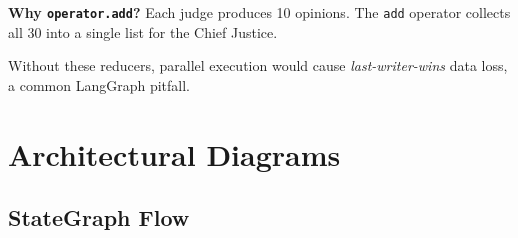\documentclass[11pt,a4paper]{article}
\begin{document}
\textbf{Why \texttt{operator.add}?}  Each judge produces 10 opinions.
The \texttt{add} operator collects all 30 into a single list for the Chief
Justice.

Without these reducers, parallel execution would cause
\emph{last-writer-wins} data loss, a common LangGraph pitfall.

\section{Architectural Diagrams}

\subsection{StateGraph Flow}
\end{document}
